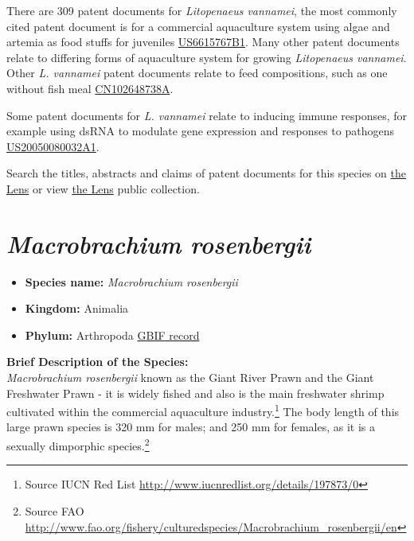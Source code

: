 \documentclass[openany]{book}
\providecommand{\tightlist}{%
  \setlength{\itemsep}{0pt}\setlength{\parskip}{0pt}}
\let\rmarkdownfootnote\footnote%
\def\footnote{\protect\rmarkdownfootnote}
\theoremstyle{definition}
\theoremstyle{definition}
\theoremstyle{definition}
\theoremstyle{remark}
\begin{document}
There are 309 patent documents for \emph{Litopenaeus vannamei}, the most
commonly cited patent document is for a commercial aquaculture system
using algae and artemia as food stuffs for juveniles
\href{https://www.lens.org/lens/patent/US_6615767_B1}{US6615767B1}. Many
other patent documents relate to differing forms of aquaculture system
for growing \emph{Litopenaeus vannamei}. Other \emph{L. vannamei} patent
documents relate to feed compositions, such as one without fish meal
\href{https://www.lens.org/lens/patent/CN_102648738_A}{CN102648738A}.

Some patent documents for \emph{L. vannamei} relate to inducing immune
responses, for example using dsRNA to modulate gene expression and
responses to pathogens
\href{https://www.lens.org/lens/patent/US_2005_0080032_A1}{US20050080032A1}.

Search the titles, abstracts and claims of patent documents for this
species on
\href{https://www.lens.org/lens/search?q=title:(\%22Litopenaeus\%20vannamei\%22)\%20OR\%20abstract:(\%22Litopenaeus\%20vannamei\%22)\%20OR\%20claims:(\%22Litopenaeus\%20vannamei\%22)\&l=en\&preview=true}{the
Lens} or view \href{https://www.lens.org/lens/collection/167171}{the
Lens} public collection.

\hypertarget{macrobrachium-rosenbergii}{%
\section{\texorpdfstring{\emph{Macrobrachium
rosenbergii}}{Macrobrachium rosenbergii}}\label{macrobrachium-rosenbergii}}

\begin{itemize}
\tightlist
\item
  \textbf{Species name:} \emph{Macrobrachium rosenbergii}\\
\item
  \textbf{Kingdom:} Animalia\\
\item
  \textbf{Phylum:} Arthropoda
  \href{https://www.gbif.org/species/2224546}{GBIF record}
\end{itemize}

\textbf{Brief Description of the Species:}\\
\emph{Macrobrachium rosenbergii} known as the Giant River Prawn and the
Giant Freshwater Prawn - it is widely fished and also is the main
freshwater shrimp cultivated within the commercial aquaculture
industry.\footnote{Source IUCN Red List
  \url{http://www.iucnredlist.org/details/197873/0}} The body length of
this large prawn species is 320 mm for males; and 250 mm for females, as
it is a sexually dimporphic species.\footnote{Source FAO
  \url{http://www.fao.org/fishery/culturedspecies/Macrobrachium_rosenbergii/en}}
\end{document}
